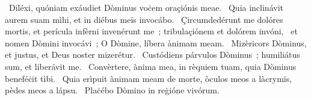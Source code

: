 \psalmChapterWithInscription{}
{ }
{%
~Diléxi, quóniam exáudiet Dòminus voċem oraçiónis meae. 
~Quia inclinávit aurem suam mìhi, et in diébus meïs invocábo. 
~Çircumdedérunt me dolóres mortis, et perícula infèrni invenérunt me~; tribulaçiónem et dolórem invóni, 
~et nomen Dòmini invocávi~; O Dòmine, líbera ànimam meam. 
~Mizèricors Dòminus, et justus, et Deus noster mizerétur. 
~Custódiens párvulos Dòminus~; humiliátus sum, et liberávit me. 
~Convèrtere, ànima mea, in rèquiem tuam, quia Dòminus beneféċit tìbi. 
~Quia erìpuit ànimam meam de morte, òculos meos a làcrymïs, pèdes meos a lápsu. 
~Plaċébo Dòmino in reġióne vivórum. 
}
